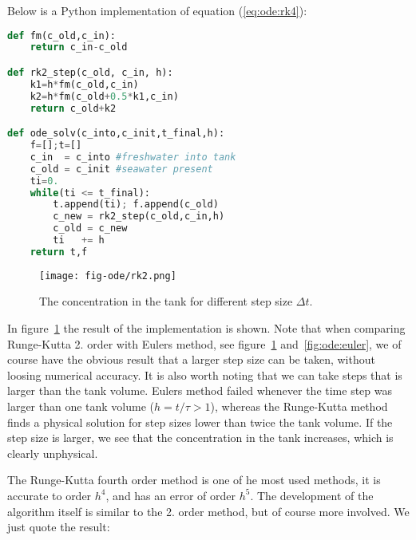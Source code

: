 \documentclass[graybox,sectrefs,envcountresetchap,open=right,final]{svmonodo}
\begin{document}
Below is a Python implementation of equation (\ref{eq:ode:rk4}):




















\begin{lstlisting}[language=python,style=blue1]
def fm(c_old,c_in):
    return c_in-c_old

def rk2_step(c_old, c_in, h):
    k1=h*fm(c_old,c_in)
    k2=h*fm(c_old+0.5*k1,c_in)
    return c_old+k2

def ode_solv(c_into,c_init,t_final,h):
    f=[];t=[]
    c_in  = c_into #freshwater into tank
    c_old = c_init #seawater present 
    ti=0.
    while(ti <= t_final):
        t.append(ti); f.append(c_old)
        c_new = rk2_step(c_old,c_in,h)     
        c_old = c_new
        ti   += h
    return t,f

\end{lstlisting}


\begin{figure}[!ht]  %
  \centerline{\texttt{[image: fig-ode/rk2.png]}}
  \caption{
  The concentration in the tank for different step size $\Delta t$. \label{fig:ode:rk2}
  }
\end{figure}

In figure~\ref{fig:ode:rk2} the result of the implementation is shown. 
Note that when comparing Runge-Kutta 2. order with Eulers method,
see figure~\ref{fig:ode:rk2} and~\ref{fig:ode:euler},
we of course have 
the obvious result that a larger step size can be taken, without loosing numerical accuracy. It is also worth noting that we can take steps that
is larger than the tank volume. Eulers method failed whenever the time step was larger than one tank volume ($h=t/\tau>1$), whereas the Runge-Kutta 
method finds a physical solution for step sizes lower than twice the tank volume. If the step size is larger, we see that the concentration in the tank
increases, which is clearly unphysical. 

The Runge-Kutta fourth order method is one of he most used methods, it is accurate to order $h^4$, and has an error of order $h^5$. The development of the 
algorithm itself is similar to the 2. order method, but of course more involved. We just quote the result:
\end{document}
